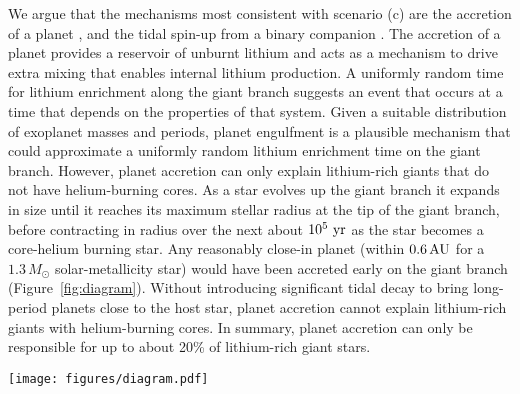 \documentclass[twocolumn]{aastex62}
\begin{document}
We argue that the mechanisms most consistent with scenario (c) are the 
accretion of a planet \citep{Siess_1999}, and the tidal spin-up from a binary companion \citep{Fekel_1993}. The accretion of a planet provides a reservoir
of unburnt lithium and acts as a mechanism to drive extra mixing that 
enables internal lithium production. 
A uniformly random time for lithium enrichment along the 
giant branch suggests
an event that occurs at a time that depends on the properties of that system.
Given a suitable distribution of exoplanet masses and periods, planet engulfment
is a plausible mechanism that could approximate a uniformly random lithium enrichment time 
on the giant branch.
However, planet accretion can only explain lithium-rich giants that do not have helium-burning cores. 
As a star evolves up the giant branch it expands in size until it reaches its maximum stellar radius at 
the tip of the giant branch, before contracting in radius over the next 
about $10^5~{\rm yr}$ as the star becomes a core-helium burning star. 
Any reasonably close-in planet (within $0.6\,{\rm AU}$ for a $1.3\,M_\odot$ solar-metallicity star) would have been accreted early on the giant branch (Figure~\ref{fig:diagram}).
Without 
introducing significant tidal decay to bring long-period planets close to the host star, planet accretion cannot explain lithium-rich giants with helium-burning cores.
In summary, planet accretion can only be responsible for up to about 20\% of lithium-rich giant stars.


\begin{figure*}
	\texttt{[image: figures/diagram.pdf]}
	\caption{
		A schematic illustrating the mechanisms that can produce lithium-rich giants at the clump and at a random time on the giant branch. 
		Only tidal locking can produce lithium-rich giants in the core-helium burning phase. Tidal interactions can spin-up the primary when it is on the giant branch (spin is indicated by rotation arrows). Planetary accretion can also cause lithium enrichment (shown in blue) on the giant branch, where the time will depend on the planet's orbital radius. Schematic is not to scale in length or time.}
	\label{fig:diagram}
\end{figure*}
\end{document}
